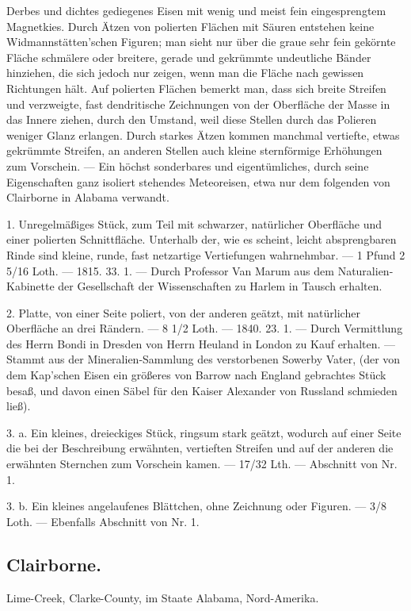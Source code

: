 \documentclass[a4paper, 11pt, oneside, polutonikogreek, german]{article}
\begin{document}
Derbes und dichtes gediegenes Eisen mit wenig und meist fein eingesprengtem Magnetkies. Durch Ätzen von polierten Flächen mit Säuren entstehen keine Widmannstätten'schen Figuren; man sieht nur über die graue sehr fein gekörnte Fläche schmälere oder breitere, gerade und gekrümmte undeutliche Bänder hinziehen, die sich jedoch nur zeigen, wenn man die Fläche nach gewissen Richtungen hält. Auf polierten Flächen bemerkt man, dass sich breite Streifen und verzweigte, fast dendritische Zeichnungen von der Oberfläche der Masse in das Innere ziehen, durch den Umstand, weil diese Stellen durch das Polieren weniger Glanz erlangen. Durch starkes Ätzen kommen manchmal vertiefte, etwas gekrümmte Streifen, an anderen Stellen auch kleine sternförmige Erhöhungen zum Vorschein. — Ein höchst sonderbares und eigentümliches, durch seine Eigenschaften ganz isoliert stehendes Meteoreisen, etwa nur dem folgenden von Clairborne in Alabama verwandt.

1. Unregelmäßiges Stück, zum Teil mit schwarzer, natürlicher Oberfläche und einer polierten Schnittfläche. Unterhalb der, wie es scheint, leicht absprengbaren Rinde sind kleine, runde, fast netzartige Vertiefungen wahrnehmbar. — 1 Pfund 2 5/16 Loth. — 1815. 33. 1. — Durch Professor Van Marum aus dem Naturalien-Kabinette der Gesellschaft der Wissenschaften zu Harlem in Tausch erhalten.

2. Platte, von einer Seite poliert, von der anderen geätzt, mit natürlicher Oberfläche an drei Rändern. — 8 1/2 Loth. — 1840. 23. 1. — Durch Vermittlung des Herrn Bondi in Dresden von Herrn Heuland in London zu Kauf erhalten. — Stammt aus der Mineralien-Sammlung des verstorbenen Sowerby Vater, (der von dem Kap'schen Eisen ein größeres von Barrow nach England gebrachtes Stück besaß, und davon einen Säbel für den Kaiser Alexander von Russland schmieden ließ).

3. a. Ein kleines, dreieckiges Stück, ringsum stark geätzt, wodurch auf einer Seite die bei der Beschreibung erwähnten, vertieften Streifen und auf der anderen die erwähnten Sternchen zum Vorschein kamen. — 17/32 Lth. — Abschnitt von Nr. 1.

3. b. Ein kleines angelaufenes Blättchen, ohne Zeichnung oder Figuren. — 3/8 Loth. — Ebenfalls Abschnitt von Nr. 1.
\subsection{Clairborne.}
\begin{center}
\small
Lime-Creek, Clarke-County, im Staate Alabama, Nord-Amerika.
\end{center}
\end{document}
